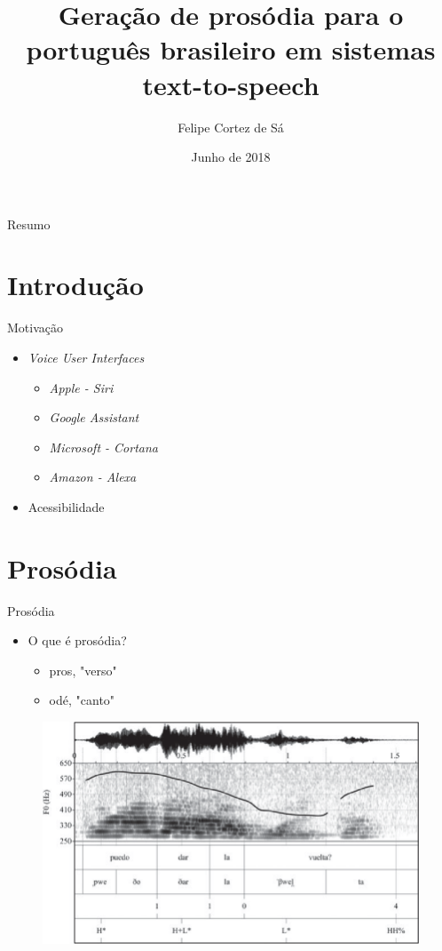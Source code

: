 \documentclass{beamer}
\title[Geração de prosódia]{Geração de prosódia para o português brasileiro em sistemas text-to-speech}
\author{Felipe Cortez de Sá}
\date{Junho de 2018}
\institute[UFRN]{Universidade Federal do Rio Grande do Norte}
\begin{document}
\begin{frame}
  \titlepage
\end{frame}

\begin{frame}{Resumo}
  \tableofcontents
\end{frame}

\section{Introdução}
\begin{frame}{Motivação}
  \begin{itemize}
    \item \emph{Voice User Interfaces}
        \begin{itemize}
            \item \emph{Apple - Siri}
            \item \emph{Google Assistant}
            \item \emph{Microsoft - Cortana}
            \item \emph{Amazon - Alexa}
        \end{itemize}
    \item Acessibilidade
  \end{itemize}
\end{frame}

\section{Prosódia}
\begin{frame}{Prosódia}
  \begin{itemize}
    \item O que é prosódia?
        \begin{itemize}
            \item pros, "verso"
            \item odé,  "canto"
        \end{itemize}
  \end{itemize}
  \pause
    \begin{figure}
      \includegraphics[scale=0.25]{prosody.png}
    \end{figure}
\end{frame}
\end{document}
